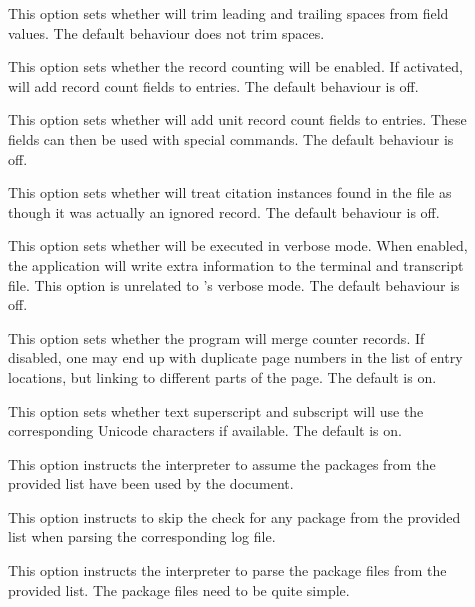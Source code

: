 \begin{description}
\begin{description}
\item[] This option sets whether  will trim leading and trailing spaces from field values. The default behaviour does not trim spaces.

\item[] This option sets whether the record counting will be enabled. If activated,  will add record count fields to entries. The default behaviour is off.

\item[] This option sets whether  will add unit record count fields to entries. These fields can then be used with special commands. The default behaviour is off.

\item[] This option sets whether  will treat citation instances found in the  file as though it was actually an ignored record. The default behaviour is off.

\item[] This option sets whether  will be executed in verbose mode. When enabled, the application will write extra information to the terminal and transcript file. This option is unrelated to \arara's verbose mode. The default behaviour is off.

\item[] This option sets whether the program will merge  counter records. If disabled, one may end up with duplicate page numbers in the list of entry locations, but linking to different parts of the page. The default is on.

\item[] This option sets whether text superscript and subscript will use the corresponding Unicode characters if available. The default is on.

\item[] This option instructs the interpreter to assume the packages from the provided list have been used by the document.

\item[] This option instructs  to skip the check for any package from the provided list when parsing the corresponding log file.

\item[] This option instructs the interpreter to parse the package files from the provided list. The package files need to be quite simple.


\end{description}
\end{description}
